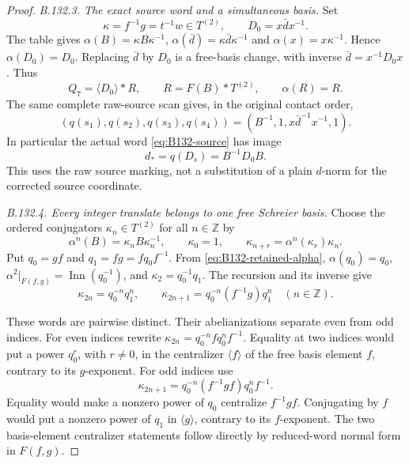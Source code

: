 \begin{proof}
\emph{B.132.3. The exact source word and a simultaneous basis.}
Set
\[
 \kappa=f^{-1}g=t^{-1}w\in T^{(2)},\qquad
 D_0=x\bar d x^{-1}.
\]
The table gives \(\alpha(B)=\kappa B\kappa^{-1}\),
\(\alpha(\bar d)=\kappa\bar d\kappa^{-1}\) and
\(\alpha(x)=x\kappa^{-1}\). Hence \(\alpha(D_0)=D_0\).
Replacing \(\bar d\) by \(D_0\) is a free-basis change, with
inverse \(\bar d=x^{-1}D_0x\). Thus
\begin{equation}\label{eq:B132-D0-basis}
 Q_7=\langle D_0\rangle*R,\qquad
 R=F(B)*T^{(2)},\qquad \alpha(R)=R.
\end{equation}
The same complete raw-source scan gives, in the original contact order,
\begin{equation}\label{eq:B132-contact-images}
 (q(s_1),q(s_2),q(s_3),q(s_4))
   =(B^{-1},1,x\bar d^{-1}x^{-1},1).
\end{equation}
In particular the actual word \eqref{eq:B132-source} has image
\begin{equation}\label{eq:B132-D-image}
 d_*=q(D_s)=B^{-1}D_0B.
\end{equation}
This uses the raw source marking, not a substitution of a plain
\(d\)-norm for the corrected source coordinate.

\emph{B.132.4. Every integer translate belongs to one free Schreier basis.}
Choose the ordered conjugators \(\kappa_n\in T^{(2)}\) for all
\(n\in\mathbb Z\) by
\[
 \alpha^n(B)=\kappa_nB\kappa_n^{-1},\qquad
 \kappa_0=1,\qquad
 \kappa_{n+r}=\alpha^n(\kappa_r)\kappa_n.
\]
Put \(q_0=gf\) and \(q_1=fg=fq_0f^{-1}\). From
\eqref{eq:B132-retained-alpha}, \(\alpha(q_0)=q_0\),
\(\alpha^2|_{F(f,g)}=\operatorname{Inn}(q_0^{-1})\), and
\(\kappa_2=q_0^{-1}q_1\). The recursion and its inverse give
\begin{equation}\label{eq:B132-all-integer}
 \kappa_{2n}=q_0^{-n}q_1^n,
 \qquad
 \kappa_{2n+1}=q_0^{-n}(f^{-1}g)q_1^n
 \quad(n\in\mathbb Z).
\end{equation}

These words are pairwise distinct. Their abelianizations separate
even from odd indices. For even indices rewrite
\(\kappa_{2n}=q_0^{-n}fq_0^nf^{-1}\). Equality at two indices
would put a power \(q_0^r\), with \(r\ne0\), in the centralizer
\(\langle f\rangle\) of the free basis element \(f\), contrary
to its \(g\)-exponent. For odd indices use
\[
 \kappa_{2n+1}=q_0^{-n}(f^{-1}gf)q_0^nf^{-1}.
\]
Equality would make a nonzero power of \(q_0\) centralize
\(f^{-1}gf\). Conjugating by \(f\) would put a nonzero power of
\(q_1\) in \(\langle g\rangle\), contrary to its
\(f\)-exponent. The two basis-element centralizer statements follow
directly by reduced-word normal form in \(F(f,g)\).


\end{proof}
